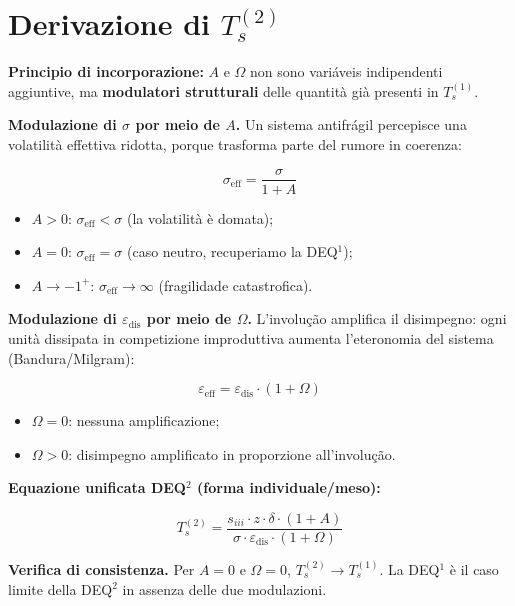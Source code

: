 \section{\texorpdfstring{Derivazione di
\(T_s^{(2)}\)}{Derivazione di T\_s\^{}\{(2)\}}}\label{derivazione-di-t_s2}

\Hypoth{} \textbf{Principio di incorporazione:} \(A\) e \(\Omega\) non
sono variáveis indipendenti aggiuntive, ma \textbf{modulatori
strutturali} delle quantità già presenti in \(T_s^{(1)}\).

\textbf{Modulazione di \(\sigma\) por meio de \(A\).} Un sistema antifrágil
percepisce una volatilità effettiva ridotta, porque trasforma parte del
rumore in coerenza:

\[
\sigma_{\text{eff}} = \frac{\sigma}{1 + A}
\]

\begin{itemize}
\tightlist
\item
  \(A > 0\): \(\sigma_{\text{eff}} < \sigma\) (la volatilità è domata);
\item
  \(A = 0\): \(\sigma_{\text{eff}} = \sigma\) (caso neutro, recuperiamo
  la DEQ$^1$);
\item
  \(A \to -1^+\): \(\sigma_{\text{eff}} \to \infty\) (fragilidade
  catastrofica).
\end{itemize}

\textbf{Modulazione di \(\varepsilon_{\text{dis}}\) por meio de \(\Omega\).}
L'involução amplifica il disimpegno: ogni unità dissipata in
competizione improduttiva aumenta l'eteronomia del sistema
(Bandura/Milgram):

\[
\varepsilon_{\text{eff}} = \varepsilon_{\text{dis}} \cdot (1 + \Omega)
\]

\begin{itemize}
\tightlist
\item
  \(\Omega = 0\): nessuna amplificazione;
\item
  \(\Omega > 0\): disimpegno amplificato in proporzione all'involução.
\end{itemize}

\textbf{Equazione unificata DEQ$^2$ (forma individuale/meso):}

\[
\boxed{T_s^{(2)} = \frac{s_{iii} \cdot z \cdot \delta \cdot (1+A)}{\sigma \cdot \varepsilon_{\text{dis}} \cdot (1+\Omega)}}
\]

\Proved{} \textbf{Verifica di consistenza.} Per \(A = 0\) e
\(\Omega = 0\), \(T_s^{(2)} \to T_s^{(1)}\). La DEQ$^1$ è il caso limite
della DEQ$^2$ in assenza delle due modulazioni.



